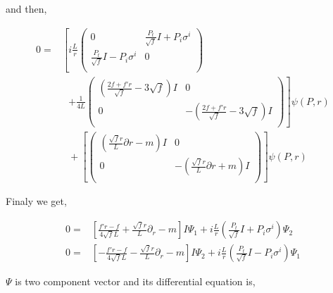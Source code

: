 and then,

\begin{align}
   0 =& \left[ i\frac{L}{r} \begin{pmatrix} 0 & \frac{P_t}{\sqrt{f}}I + P_i\sigma^i \\ \frac{P_t}{\sqrt{f}}I - P_i\sigma^i & 0 \\ \end{pmatrix} \right.\nonumber\\
      & ~~~ \left. + \frac{1}{4L}\begin{pmatrix} \left(\frac{2f+f'r}{\sqrt{f}} - 3\sqrt{f}\right)I & 0 \\ 0 & -\left(\frac{2f+f'r}{\sqrt{f}} - 3\sqrt{f}\right)I \\ \end{pmatrix} \right] \psi(P,r)\nonumber\\
      & ~~~ + \left[ \begin{pmatrix} (\frac{\sqrt{f}r}{L}\partial r-m)I & 0 \\ 0 & -(\frac{\sqrt{f}r}{L}\partial r+m)I\\ \end{pmatrix}  \right] \psi(P,r)
\end{align}

Finaly we get,

\begin{align}
   0 =& \left[ \frac{f'r-f}{4\sqrt{f}L} + \frac{\sqrt{f}r}{L}\partial_r - m \right]I\Psi_1 + i\frac{L}{r}(\frac{P_t}{\sqrt{f}} I + P_i\sigma^i)\Psi_2 \nonumber\\
   0 =& \left[ -\frac{f'r-f}{4\sqrt{f}L} - \frac{\sqrt{f}r}{L}\partial_r - m \right]I\Psi_2 + i\frac{L}{r}(\frac{P_t}{\sqrt{f}} I - P_i\sigma^i)\Psi_1
\end{align}

$\Psi$ is two component vector and its differential equation is,



